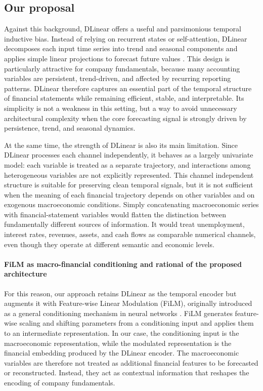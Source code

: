 \documentclass[a4paper,fleqn]{cas-dc}
\begin{document}
\subsection{Our proposal}
Against this background, DLinear offers a useful and parsimonious temporal inductive bias. Instead of relying on recurrent states or self-attention, DLinear decomposes each input time series into trend and seasonal components and applies simple linear projections to forecast future values \citep{zeng_are_2023}. This design is particularly attractive for company fundamentals,  because many accounting variables are persistent, trend-driven, and affected by recurring reporting patterns. DLinear therefore captures an essential part of the temporal structure of financial statements while remaining efficient, stable, and interpretable. Its simplicity is not a weakness in this setting, but a way to avoid unnecessary architectural complexity when the core forecasting signal is strongly driven by persistence, trend, and seasonal dynamics.

At the same time, the strength of DLinear is also its main limitation. Since DLinear processes each channel independently, it behaves as a largely univariate model: each variable is treated as a separate trajectory, and interactions among heterogeneous variables are not explicitly represented. This channel independent structure is suitable for preserving clean temporal signals, but it is not sufficient when the meaning of each financial trajectory depends on other variables and on exogenous macroeconomic conditions. Simply concatenating macroeconomic series with financial-statement variables would flatten the distinction between fundamentally different sources of information. It would treat unemployment, interest rates, revenues, assets, and cash flows as comparable numerical channels, even though they operate at different semantic and economic levels.

\paragraph{FiLM as macro-financial conditioning and rational of the proposed architecture}
For this reason, our approach retains DLinear as the temporal encoder but augments it with Feature-wise Linear Modulation (FiLM), originally introduced as a general conditioning mechanism in neural networks \citep{perez2018film}. FiLM generates feature-wise scaling and shifting parameters from a conditioning input and applies them to an intermediate representation. In our case, the conditioning input is the macroeconomic representation, while the modulated representation is the financial embedding produced by the DLinear encoder. The macroeconomic variables are therefore not treated as additional financial features to be forecasted or reconstructed. Instead, they act as contextual information that reshapes the encoding of company fundamentals.
\end{document}
